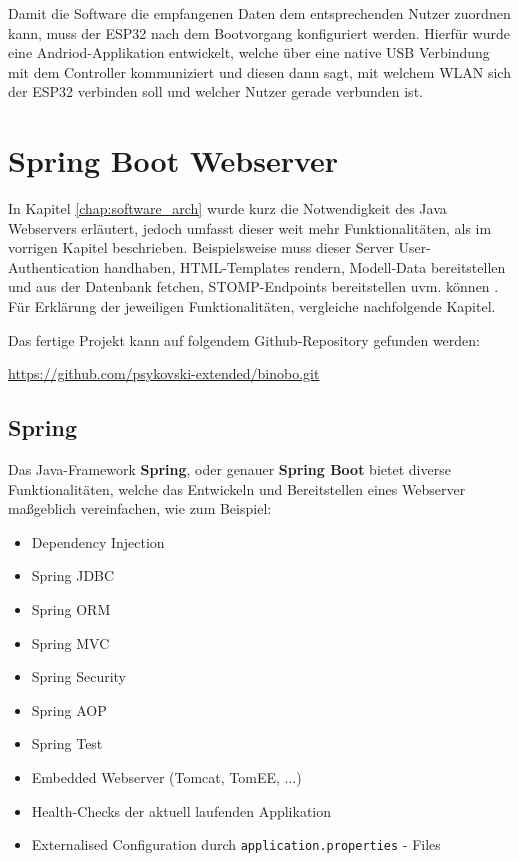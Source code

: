 \documentclass[paper=a4,12pt]{scrreprt}
\begin{document}
Damit die Software die empfangenen Daten dem entsprechenden Nutzer zuordnen kann, muss der ESP32 nach dem Bootvorgang konfiguriert werden. Hierfür wurde eine Andriod-Applikation entwickelt, welche über eine native USB Verbindung mit dem
Controller kommuniziert und diesen dann sagt, mit welchem WLAN sich der ESP32 verbinden soll und welcher Nutzer gerade verbunden ist.\newline

\chapter{Spring Boot Webserver}
\label{chap:spring_boot_webserver}

In Kapitel \ref{chap:software_arch} wurde kurz die Notwendigkeit des Java Webservers erläutert, jedoch umfasst dieser weit mehr Funktionalitäten, als im vorrigen Kapitel beschrieben.\newline
Beispielsweise muss dieser Server User-Authentication handhaben, HTML-Templates rendern, Modell-Data bereitstellen und aus der Datenbank fetchen, STOMP-Endpoints bereitstellen uvm. können . Für Erklärung der
jeweiligen Funktionalitäten, vergleiche nachfolgende Kapitel.\newline

Das fertige Projekt kann auf folgendem Github-Repository gefunden werden:\newline

\url{https://github.com/psykovski-extended/binobo.git}

\section{Spring}

Das Java-Framework \textbf{Spring}, oder genauer \textbf{Spring Boot} bietet diverse Funktionalitäten, welche das Entwickeln und Bereitstellen eines Webserver maßgeblich vereinfachen, wie zum Beispiel:\newline
\begin{itemize}
  \item Dependency Injection\cite{dep_inj}
  \item Spring JDBC\cite{spring_jdbc}
  \item Spring ORM
  \item Spring MVC\cite{mvc}
  \item Spring Security\cite{spring_sec}
  \item Spring AOP\cite{spring_aop}
  \item Spring Test
  \item Embedded Webserver (Tomcat\cite{tomcat}, TomEE\cite{tomee}, ...)
  \item Health-Checks der aktuell laufenden Applikation
  \item Externalised Configuration durch \texttt{application.properties} - Files
\end{itemize}
\end{document}
